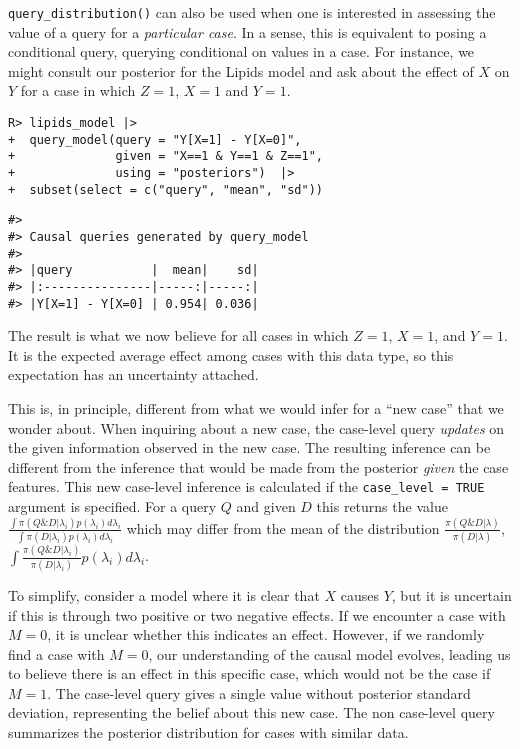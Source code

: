 \documentclass[
  11pt,
  article]{jss}
\begin{document}
\texttt{query\_distribution()} can also be used when one is interested
in assessing the value of a query for a \emph{particular case}. In a
sense, this is equivalent to posing a conditional query, querying
conditional on values in a case. For instance, we might consult our
posterior for the Lipids model and ask about the effect of \(X\) on
\(Y\) for a case in which \(Z=1\), \(X=1\) and \(Y=1\).

\begin{verbatim}
R> lipids_model |>
+  query_model(query = "Y[X=1] - Y[X=0]",
+              given = "X==1 & Y==1 & Z==1",
+              using = "posteriors")  |> 
+  subset(select = c("query", "mean", "sd"))
\end{verbatim}

\begin{verbatim}
#> 
#> Causal queries generated by query_model
#> 
#> |query           |  mean|    sd|
#> |:---------------|-----:|-----:|
#> |Y[X=1] - Y[X=0] | 0.954| 0.036|
\end{verbatim}

The result is what we now believe for all cases in which \(Z=1\),
\(X=1\), and \(Y=1\). It is the expected average effect among cases with
this data type, so this expectation has an uncertainty attached.

This is, in principle, different from what we would infer for a ``new
case'' that we wonder about. When inquiring about a new case, the
case-level query \emph{updates} on the given information observed in the
new case. The resulting inference can be different from the inference
that would be made from the posterior \emph{given} the case features.
This new case-level inference is calculated if the
\texttt{case\_level\ =\ TRUE} argument is specified. For a query \(Q\)
and given \(D\) this returns the value
\(\frac{\int\pi(Q \& D | \lambda_i)p(\lambda_i)d\lambda_i}{\int\pi(D | \lambda_i)p(\lambda_i)d\lambda_i}\)
which may differ from the mean of the distribution
\(\frac{\pi(Q \& D | \lambda)}{\pi(D | \lambda)}\),
\(\int \frac{\pi(Q \& D | \lambda_i)}{\pi(D | \lambda_i)} p(\lambda_i)d\lambda_i\).

To simplify, consider a model where it is clear that \(X\) causes \(Y\),
but it is uncertain if this is through two positive or two negative
effects. If we encounter a case with \(M=0\), it is unclear whether this
indicates an effect. However, if we randomly find a case with \(M=0\),
our understanding of the causal model evolves, leading us to believe
there is an effect in this specific case, which would not be the case if
\(M=1\). The case-level query gives a single value without posterior
standard deviation, representing the belief about this new case. The non
case-level query summarizes the posterior distribution for cases with
similar data.
\end{document}
